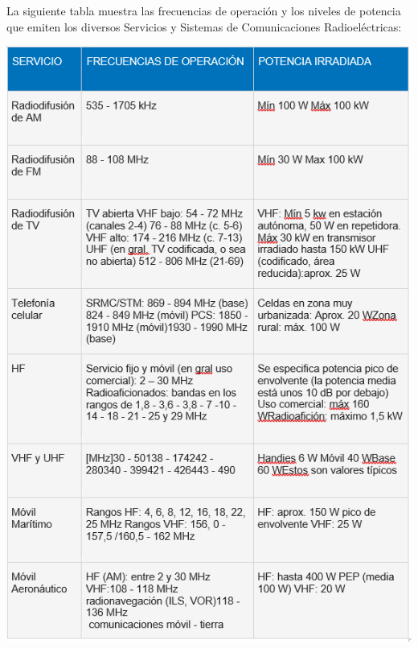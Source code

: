 La siguiente tabla muestra las frecuencias de operación y los niveles de potencia que emiten los 
diversos Servicios y Sistemas de Comunicaciones Radioeléctricas:
\begin{table}[ht]
    \begin{center}
        \includegraphics{contenido/img/tablaej5.png}
    \end{center}
\end{table}

